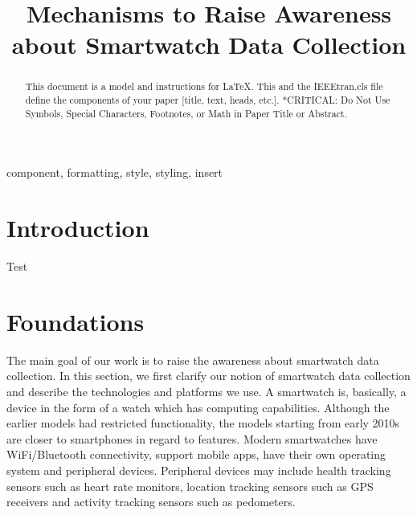 \documentclass[conference, a4paper, 10pt, twocolumn]{IEEEtran}
\begin{document}
\title{Mechanisms to Raise Awareness about Smartwatch Data Collection}

\author{
	\and
}

\maketitle
\thispagestyle{plain}
\pagestyle{plain}


\begin{abstract}
This document is a model and instructions for \LaTeX.
This and the IEEEtran.cls file define the components of your paper [title, text, heads, etc.]. *CRITICAL: Do Not Use Symbols, Special Characters, Footnotes, 
or Math in Paper Title or Abstract.
\end{abstract}

\begin{IEEEkeywords}
component, formatting, style, styling, insert
\end{IEEEkeywords}

\section{Introduction}
Test \cite{shu2016cardea}
\section{Foundations}

The main goal of our work is to raise the awareness about smartwatch data collection. In this section, we first clarify our notion of smartwatch data collection and describe the technologies and platforms we use. A smartwatch is, basically, a device in the form of a watch which has computing capabilities. Although the earlier models had restricted functionality, the models starting from early 2010s are closer to smartphones in regard to features. Modern smartwatches have WiFi/Bluetooth connectivity, support mobile apps, have their own operating system and peripheral devices. Peripheral devices may include health tracking sensors such as heart rate monitors, location tracking sensors such as GPS receivers and activity tracking sensors such as pedometers.\cite{smartwatchWiki}
\end{document}
